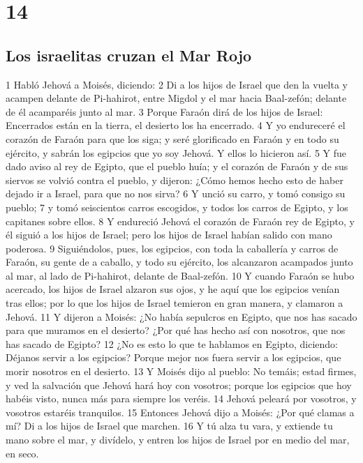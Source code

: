 \chapter{14}

\section*{Los israelitas cruzan el Mar Rojo}

1 Habló Jehová a Moisés, diciendo:
2 Di a los hijos de Israel que den la vuelta y acampen delante de Pi-hahirot, entre Migdol y el mar hacia Baal-zefón; delante de él acamparéis junto al mar.
3 Porque Faraón dirá de los hijos de Israel: Encerrados están en la tierra, el desierto los ha encerrado.
4 Y yo endureceré el corazón de Faraón para que los siga; y seré glorificado en Faraón y en todo su ejército, y sabrán los egipcios que yo soy Jehová. Y ellos lo hicieron así.
5 Y fue dado aviso al rey de Egipto, que el pueblo huía; y el corazón de Faraón y de sus siervos se volvió contra el pueblo, y dijeron: ¿Cómo hemos hecho esto de haber dejado ir a Israel, para que no nos sirva?
6 Y unció su carro, y tomó consigo su pueblo;
7 y tomó seiscientos carros escogidos, y todos los carros de Egipto, y los capitanes sobre ellos.
8 Y endureció Jehová el corazón de Faraón rey de Egipto, y él siguió a los hijos de Israel; pero los hijos de Israel habían salido con mano poderosa.
9 Siguiéndolos, pues, los egipcios, con toda la caballería y carros de Faraón, su gente de a caballo, y todo su ejército, los alcanzaron acampados junto al mar, al lado de Pi-hahirot, delante de Baal-zefón.
10 Y cuando Faraón se hubo acercado, los hijos de Israel alzaron sus ojos, y he aquí que los egipcios venían tras ellos; por lo que los hijos de Israel temieron en gran manera, y clamaron a Jehová.
11 Y dijeron a Moisés: ¿No había sepulcros en Egipto, que nos has sacado para que muramos en el desierto? ¿Por qué has hecho así con nosotros, que nos has sacado de Egipto?
12 ¿No es esto lo que te hablamos en Egipto, diciendo: Déjanos servir a los egipcios? Porque mejor nos fuera servir a los egipcios, que morir nosotros en el desierto.
13 Y Moisés dijo al pueblo: No temáis; estad firmes, y ved la salvación que Jehová hará hoy con vosotros; porque los egipcios que hoy habéis visto, nunca más para siempre los veréis.
14 Jehová peleará por vosotros, y vosotros estaréis tranquilos.
15 Entonces Jehová dijo a Moisés: ¿Por qué clamas a mí? Di a los hijos de Israel que marchen.
16 Y tú alza tu vara, y extiende tu mano sobre el mar, y divídelo, y entren los hijos de Israel por en medio del mar, en seco.
